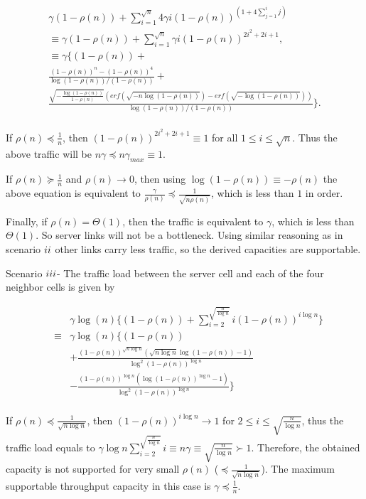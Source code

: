 \documentclass[journal]{IEEEtran}
\theoremstyle{plain}
\theoremstyle{remark}
\begin{document}
\begin{IEEEproof}
\begin{eqnarray}
&\gamma (1-\rho(n))+\sum_{i=1}^{\sqrt{n}}4\gamma i (1-\rho(n))^{(1+4\sum_{j=1}^ij)}& \nonumber \\
&\equiv \gamma (1-\rho(n))+\sum_{i=1}^{\sqrt{n}}\gamma i (1-\rho(n))^{2i^2+2i+1},& \nonumber \\
&\equiv \gamma\{(1-\rho(n)) +& \nonumber \\
& \frac{(1-\rho(n))^n-(1-\rho(n))^4 }{\log (1-\rho(n))/(1-\rho(n))}+& \nonumber \\
& \frac{\sqrt{-\frac{\log (1-\rho(n))}{1-\rho(n)}}(erf(\sqrt{-n\log (1-\rho(n))})-erf(\sqrt{-\log (1-\rho(n))}))}{\log (1-\rho(n))/(1-\rho(n))}\}. & \nonumber \\
\end{eqnarray} 

If $\rho(n) \preceq \frac{1}{n}$, then $(1-\rho(n))^{2i^2+2i+1} \equiv 1$ for all $1\leq i \leq \sqrt{n}$. Thus the above traffic will be $n\gamma \preceq n\gamma_{max} \equiv 1$.

If $\rho(n) \succeq \frac{1}{n}$ and $\rho(n) \rightarrow 0$, then using $\log (1-\rho(n)) \equiv -\rho(n)$ the above equation is equivalent to $\frac{\gamma}{\rho(n)} \preceq \frac{1}{\sqrt{n\rho(n)}}$, which is less than $1$ in order.

Finally, if $\rho(n)=\Theta(1)$, then the traffic is equivalent to $\gamma$, which is less than $\Theta(1)$.
 So server links will not be a bottleneck. Using similar reasoning as in scenario $\romannumeral 2$ other links carry less traffic, so the derived capacities are supportable.


Scenario $\romannumeral 3$- The traffic load between the server cell and each of the four neighbor cells is given by

\begin{eqnarray}
&&\gamma \log (n) \{(1-\rho(n))+\sum_{i=2}^{\sqrt{\frac{n}{\log n}}}i(1-\rho(n))^{i\log n}\} \nonumber \\
&\equiv& \gamma \log (n) \{(1-\rho(n))  \nonumber \\
&& +\frac{(1-\rho(n))^{\sqrt{n\log n}}(\sqrt{n\log n}\log (1-\rho(n))-1)}{\log^2 (1-\rho(n))^{\log n}} \nonumber \\
&& -\frac{(1-\rho(n))^{\log n}(\log (1-\rho(n))^{\log n}-1)}{\log^2 (1-\rho(n))^{\log n}}\} \nonumber \\
\label{eq44}
\end{eqnarray}

If $\rho(n) \preceq \frac{1}{\sqrt{n\log n}}$, then $(1-\rho(n))^{i\log n}\rightarrow 1$ for $2\leq i \leq \sqrt{\frac{n}{\log n}}$, thus the traffic load equals to $\gamma \log n \sum_{i=2}^{\sqrt{\frac{n}{\log n}}}i \equiv n\gamma \equiv \sqrt{\frac{n}{\log n}} \succ 1$. Therefore, the obtained capacity is not supported for very small $\rho(n)$ ($\preceq \frac{1}{\sqrt{n\log n}}$). The maximum supportable throughput capacity in this case is $\gamma \preceq \frac{1}{n}$.  


\end{IEEEproof}
\end{document}
